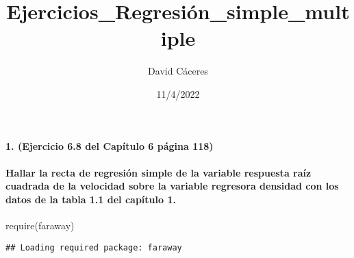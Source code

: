 \documentclass[
]{article}
\title{Ejercicios\_Regresión\_simple\_multiple}
\author{David Cáceres}
\date{11/4/2022}
\newenvironment{Shaded}{\begin{snugshade}}{\end{snugshade}}
\newcommand{\FunctionTok}[1]{\textcolor[rgb]{0.00,0.00,0.00}{#1}}
\newcommand{\NormalTok}[1]{#1}
\begin{document}
\maketitle

\hypertarget{ejercicio-6.8-del-capuxedtulo-6-puxe1gina-118}{%
\paragraph{1. (Ejercicio 6.8 del Capítulo 6 página
118)}\label{ejercicio-6.8-del-capuxedtulo-6-puxe1gina-118}}

\hypertarget{hallar-la-recta-de-regresiuxf3n-simple-de-la-variable-respuesta-rauxedz-cuadrada-de-la-velocidad-sobre-la-variable-regresora-densidad-con-los-datos-de-la-tabla-1.1-del-capuxedtulo-1.}{%
\paragraph{Hallar la recta de regresión simple de la variable respuesta
raíz cuadrada de la velocidad sobre la variable regresora densidad con
los datos de la tabla 1.1 del capítulo
1.}\label{hallar-la-recta-de-regresiuxf3n-simple-de-la-variable-respuesta-rauxedz-cuadrada-de-la-velocidad-sobre-la-variable-regresora-densidad-con-los-datos-de-la-tabla-1.1-del-capuxedtulo-1.}}

\begin{Shaded}
\begin{Highlighting}[]
\FunctionTok{require}\NormalTok{(faraway)}
\end{Highlighting}
\end{Shaded}

\begin{verbatim}
## Loading required package: faraway
\end{verbatim}
\end{document}
